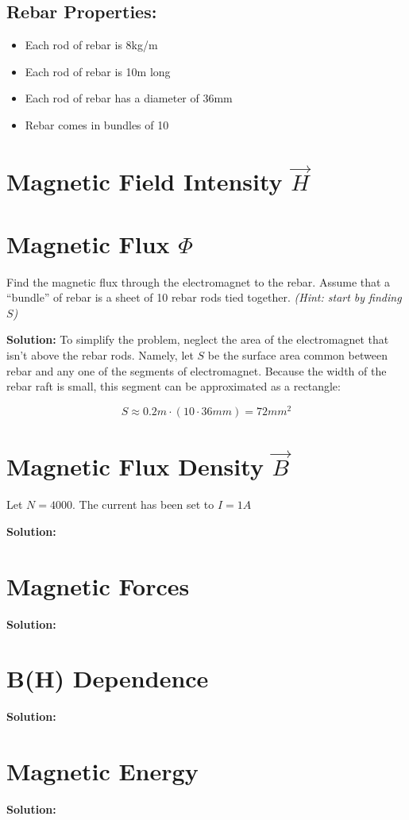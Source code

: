 \documentclass{./cls/hw}
\newcommand{\sol}{\large\textbf{Solution: }\normalsize}
\begin{document}
\subsection*{Rebar Properties:}
\begin{itemize}
  \item Each rod of rebar is 8kg/m
  \item Each rod of rebar is 10m long
  \item Each rod of rebar has a diameter of 36mm
  \item Rebar comes in bundles of 10
\end{itemize}



\section{Magnetic Field Intensity $\vec{H}$}


\section{Magnetic Flux $\Phi$}
Find the magnetic flux through the electromagnet to the rebar. Assume that a
``bundle'' of rebar is a sheet of 10 rebar rods tied together. \emph{(Hint:
start by finding $S$)}

\sol  To simplify the problem, neglect
the area of the electromagnet that isn't above the rebar rods. Namely, let $S$
be the surface area common between rebar and any one of the segments of
electromagnet. Because the width of the rebar raft is small, this segment can
be approximated as a rectangle:

\[ S \approx 0.2m \cdot (10 \cdot 36mm) = 72mm^2\]




\section{Magnetic Flux Density $\vec{B}$}
Let $N=4000$. The current has been set to $I=1A$ 

\sol
\section{Magnetic Forces}
\sol
\section{B(H) Dependence}
\sol
\section{Magnetic Energy}
\sol
\end{document}
